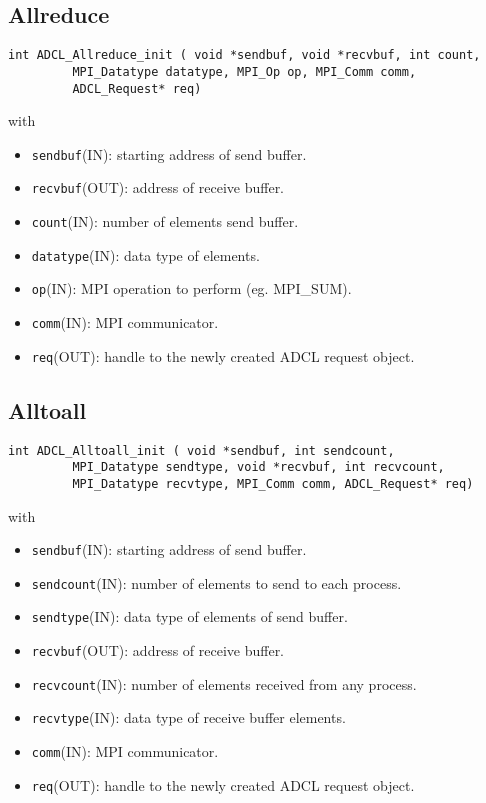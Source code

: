 {{\subsection{Allreduce}

\begin{verbatim}
int ADCL_Allreduce_init ( void *sendbuf, void *recvbuf, int count,
         MPI_Datatype datatype, MPI_Op op, MPI_Comm comm, 
         ADCL_Request* req)
\end{verbatim}
with
\begin{itemize}
\item {\tt sendbuf}(IN): starting address of send buffer.
\item {\tt recvbuf}(OUT): address of receive buffer.
\item {\tt count}(IN): number of elements send buffer.
\item {\tt datatype}(IN): data type of elements.
\item {\tt op}(IN): MPI operation to perform (eg. MPI\_SUM).
\item {\tt comm}(IN): MPI communicator.
\item {\tt req}(OUT): handle to the newly created ADCL request object.
\end{itemize}

\subsection{Alltoall}

\begin{verbatim}
int ADCL_Alltoall_init ( void *sendbuf, int sendcount, 
         MPI_Datatype sendtype, void *recvbuf, int recvcount, 
         MPI_Datatype recvtype, MPI_Comm comm, ADCL_Request* req)
\end{verbatim}
with
\begin{itemize}
\item {\tt sendbuf}(IN): starting address of send buffer.
\item {\tt sendcount}(IN): number of elements to send to each process.
\item {\tt sendtype}(IN): data type of elements of send buffer.
\item {\tt recvbuf}(OUT): address of receive buffer.
\item {\tt recvcount}(IN): number of elements received from any process.
\item {\tt recvtype}(IN): data type of receive buffer elements.
\item {\tt comm}(IN): MPI communicator.
\item {\tt req}(OUT): handle to the newly created ADCL request object.
\end{itemize}

}}
